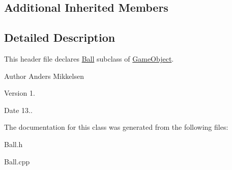 \subsection*{Additional Inherited Members}


\subsection{Detailed Description}
This header file declares \hyperlink{class_ball}{Ball} subclass of \hyperlink{class_game_object}{Game\+Object}. 

\begin{DoxyAuthor}{Author}
Anders Mikkelsen 
\end{DoxyAuthor}
\begin{DoxyVersion}{Version}
1. 
\end{DoxyVersion}
\begin{DoxyDate}{Date}
13.. 
\end{DoxyDate}


The documentation for this class was generated from the following files\+:\begin{DoxyCompactItemize}
\item 
Ball.\+h\item 
Ball.\+cpp\end{DoxyCompactItemize}
